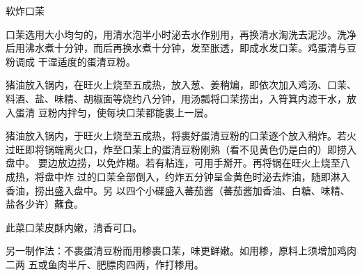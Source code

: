 \begin{recipe}{软炸口茉}

\ingredients


\preparation

\step 口茉选用大小均匀的，用清水泡半小时泌去水作别用，再换清水淘洗去泥沙。洗净
后用沸水煮十分钟，而后再换水煮十分钟，发至胀透，即成水发口茉。鸡蛋清与豆粉调成
干湿适度的蛋清豆粉。

\step 猪油放入锅内，在旺火上烧至五成热，放入葱、姜稍煸，即依次加入鸡汤、口茉、
料酒、盐、味精、胡椒面等烧约八分钟，用汤瓢将口茉捞出，入筲箕内滤干水，放入蛋清
豆粉内拌匀，使每块口茉都能裹上一层。

\step 猪油放入锅内，于旺火上烧至五成热，将裹好蛋清豆粉的口茉逐个放入稍炸。若火
过旺即将锅端离火口，炸至口茉上的蛋清豆粉刚熟（看不见黄色仍是白的）即捞入盘中。
要边放边捞，以免炸糊。若有粘连，可用手掰开。再将锅在旺火上烧至八成热，将盘中炸
过的口茉全部倒入，约炸五分钟呈金黄色时泌去炸油，随即淋入香油，捞出盛入盘中。另
以四个小碟盛入蕃茄酱（蕃茄酱加香油、白糖、味精、盐各少许）蘸食。

\features

此菜口茉皮酥内嫩，清香可口。

另一制作法：不裹蛋清豆粉而用糁裹口茉，味更鲜嫩。如用糁，原料上须增加鸡肉二两
五或鱼肉半斤、肥膘肉四两，作打糁用。

\end{recipe}

